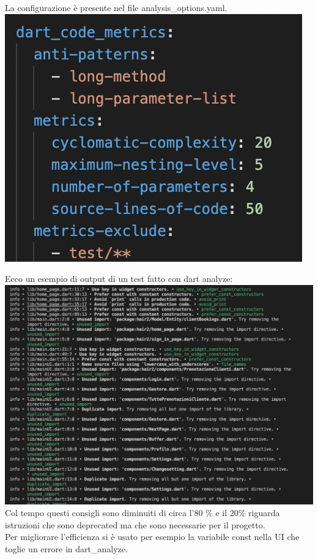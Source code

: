 \documentclass{article}
\begin{document}
La configurazione è presente nel file analysis\_options.yaml.
\\\includegraphics[scale = 0.5]{"Immagini/ParametriQuality.png"}

Ecco un esempio di output di un test fatto con dart analyze:
\\\includegraphics[scale = 0.5]{"Immagini/Dart_analyze.png"}
\\Col tempo questi consigli sono diminuiti di circa l'80 \% e il 20\% riguarda istruzioni
che sono deprecated ma che sono necessarie per il progetto.
\\Per migliorare l'efficienza si è usato per esempio la variabile const nella UI che toglie un errore in dart\_analyze.
\end{document}

